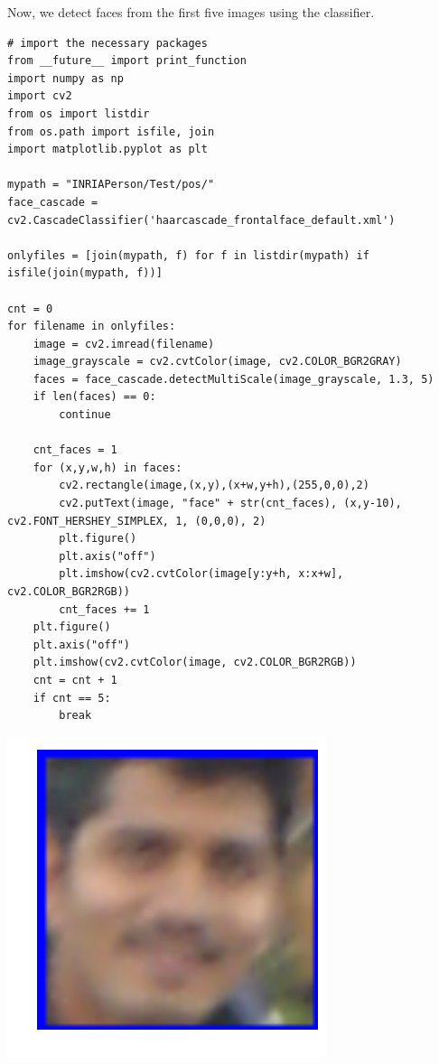 Now, we detect faces from the first five images using the classifier.

\begin{verbatim}
# import the necessary packages
from __future__ import print_function
import numpy as np
import cv2
from os import listdir
from os.path import isfile, join
import matplotlib.pyplot as plt

mypath = "INRIAPerson/Test/pos/"
face_cascade = cv2.CascadeClassifier('haarcascade_frontalface_default.xml')

onlyfiles = [join(mypath, f) for f in listdir(mypath) if isfile(join(mypath, f))]

cnt = 0
for filename in onlyfiles:
    image = cv2.imread(filename)
    image_grayscale = cv2.cvtColor(image, cv2.COLOR_BGR2GRAY)
    faces = face_cascade.detectMultiScale(image_grayscale, 1.3, 5)
    if len(faces) == 0:
        continue

    cnt_faces = 1
    for (x,y,w,h) in faces:
        cv2.rectangle(image,(x,y),(x+w,y+h),(255,0,0),2)
        cv2.putText(image, "face" + str(cnt_faces), (x,y-10), cv2.FONT_HERSHEY_SIMPLEX, 1, (0,0,0), 2)
        plt.figure()
        plt.axis("off")
        plt.imshow(cv2.cvtColor(image[y:y+h, x:x+w], cv2.COLOR_BGR2RGB))
        cnt_faces += 1
    plt.figure()
    plt.axis("off")
    plt.imshow(cv2.cvtColor(image, cv2.COLOR_BGR2RGB))        
    cnt = cnt + 1
    if cnt == 5:
        break
\end{verbatim}

\includegraphics{facedetection_files/facedetection_59_0.png}

